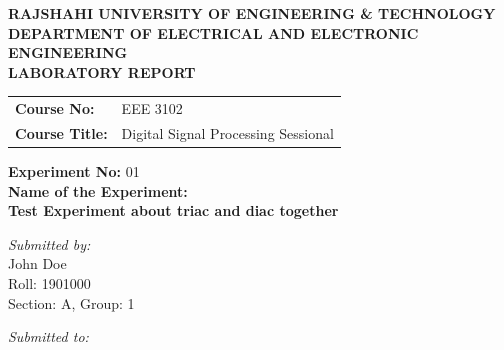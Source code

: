 \documentclass[12pt,a4paper]{article}
\begin{document}
\begin{titlepage}
    \sffamily
    \centering
    \vspace*{1cm}
    
    \Large \textbf{\MakeUppercase{ Rajshahi University of Engineering \& Technology }} \\
    \vspace{0.5cm}
    \large \textbf{\MakeUppercase{ Department of Electrical and Electronic Engineering }} \\
    
    \vspace{2.5cm}
    \Large \textbf{LABORATORY REPORT} \\
    \vspace{1cm}
    
    \begin{tabular}{ll}
        \textbf{Course No:} & EEE 3102 \\
        \textbf{Course Title:} & Digital Signal Processing Sessional \\
    \end{tabular}
    
    \vspace{2cm}
    
    \textbf{Experiment No:} 01 \\
    \vspace{0.5cm}
    \textbf{Name of the Experiment:} \\
    \Large \textbf{ Test Experiment about triac and diac together } \\
    
    \vspace{2.5cm}
    
    \begin{minipage}[t]{0.4\textwidth}
        \begin{flushleft} \large
            \emph{Submitted by:}\\
            John Doe \\
            Roll: 1901000 \\
            Section: A, Group: 1
        \end{flushleft}
    \end{minipage}
    \hfill
    \begin{minipage}[t]{0.5\textwidth}
        \begin{flushright} \large
            \emph{Submitted to:} \\
            

\end{flushright}
\end{minipage}
\end{titlepage}
\end{document}
